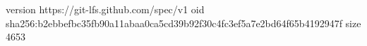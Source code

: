 version https://git-lfs.github.com/spec/v1
oid sha256:b2ebbefbc35fb90a11abaa0ca5cd39b92f30c4fc3ef5a7e2bd64f65b4192947f
size 4653
